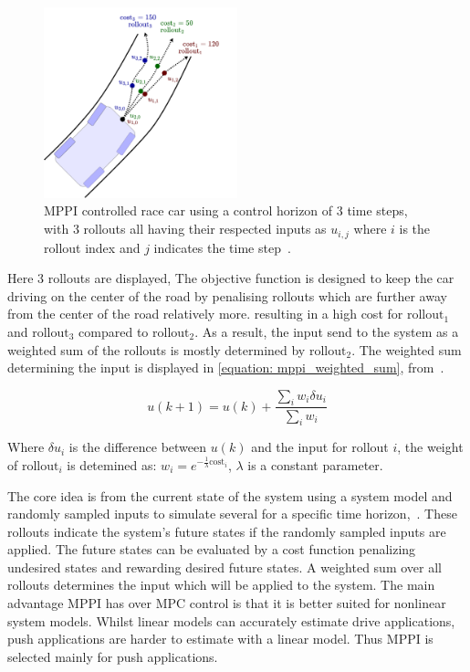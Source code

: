 \begin{figure}[H]
    \centering
    \includegraphics[width=0.5\textwidth]{figures/appendix/MPPI_car_with_rollouts.png}
    \caption{\acs{MPPI} controlled race car using a control horizon of 3 time steps, with 3 rollouts all having their respected inputs as $u_{i,j}$ where $i$ is the rollout index and $j$ indicates the time step~\cite{neuromorphictutorial_ltc21_2021}.}
    \label{figure: mppi_car_with_rollouts}
\end{figure}

Here 3 rollouts are displayed, The objective function is designed to keep the car driving on the center of the road by penalising rollouts which are further away from the center of the road relatively more. resulting in a high cost for $\text{rollout}_1$ and $\text{rollout}_3$ compared to $\text{rollout}_2$. As a result, the input send to the system as a weighted sum of the rollouts is mostly determined by $\text{rollout}_2$. The weighted sum determining the input is displayed in \cref{equation: mppi_weighted_sum}, from~\cite{neuromorphictutorial_ltc21_2021}.

\begin{equation}
u(k+1)=u(k)+\frac{\sum_{i} w_{i} \delta u_{i}}{\sum_{i} w_{i}}
\label{equation: mppi_weighted_sum}
\end{equation}

Where $\delta u_i$ is the difference between $u(k)$ and the input for rollout $i$, the weight of $\text{rollout}_i$ is detemined as: $w_{i}=e^{-\frac{1}{\lambda} \text{cost}_{i}}$, $\lambda$ is a constant parameter.\bs


The core idea is from the current state of the system using a system model and randomly sampled inputs to simulate several  for a specific time horizon,~\cite{neuromorphictutorial_ltc21_2021}. These rollouts indicate the system's future states if the randomly sampled inputs are applied. The future states can be evaluated by a cost function penalizing undesired states and rewarding desired future states. A weighted sum over all rollouts determines the input which will be applied to the system. The main advantage \ac{MPPI} has over \ac{MPC} control is that it is better suited for nonlinear system models. Whilst linear models can accurately estimate drive applications, push applications are harder to estimate with a linear model. Thus \ac{MPPI} is selected mainly for push applications.\bs

